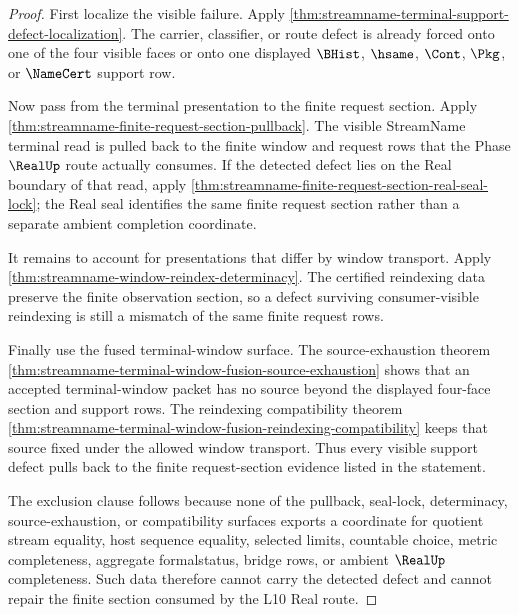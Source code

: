 \begin{proof}
First localize the visible failure. Apply
\autoref{thm:streamname-terminal-support-defect-localization}. The carrier,
classifier, or route defect is already forced onto one of the four visible
faces or onto one displayed $\BHist$, $\hsame$, $\Cont$, $\Pkg$, or
$\NameCert$ support row.

Now pass from the terminal presentation to the finite request section. Apply
\autoref{thm:streamname-finite-request-section-pullback}. The visible
StreamName terminal read is pulled back to the finite window and request rows
that the Phase $\RealUp$ route actually consumes. If the detected defect lies
on the Real boundary of that read, apply
\autoref{thm:streamname-finite-request-section-real-seal-lock}; the Real seal
identifies the same finite request section rather than a separate ambient
completion coordinate.

It remains to account for presentations that differ by window transport.
Apply \autoref{thm:streamname-window-reindex-determinacy}. The certified
reindexing data preserve the finite observation section, so a defect surviving
consumer-visible reindexing is still a mismatch of the same finite request
rows.

Finally use the fused terminal-window surface. The source-exhaustion theorem
\autoref{thm:streamname-terminal-window-fusion-source-exhaustion} shows that
an accepted terminal-window packet has no source beyond the displayed
four-face section and support rows. The reindexing compatibility theorem
\autoref{thm:streamname-terminal-window-fusion-reindexing-compatibility}
keeps that source fixed under the allowed window transport. Thus every
visible support defect pulls back to the finite request-section evidence
listed in the statement.

The exclusion clause follows because none of the pullback, seal-lock,
determinacy, source-exhaustion, or compatibility surfaces exports a coordinate
for quotient stream equality, host sequence equality, selected limits,
countable choice, metric completeness, aggregate formalstatus, bridge rows, or
ambient $\RealUp$ completeness. Such data therefore cannot carry the detected
defect and cannot repair the finite section consumed by the L10 Real route.
\end{proof}

